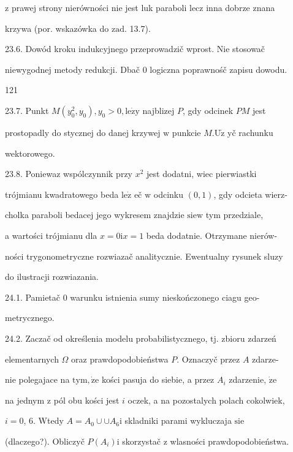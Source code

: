 \documentclass[a4paper,12pt]{article}
\begin{document}
$\mathrm{z}$ prawej strony nierówności nie jest luk paraboli lecz inna dobrze znana

krzywa (por. wskazówka do $\mathrm{z}\mathrm{a}\mathrm{d}$. 13.7).

23.6. Dowód kroku indukcyjnego przeprowadzič wprost. Nie stosowač

niewygodnej metody redukcji. Dbač $0$ logiczna poprawnośč zapisu dowodu.





121

23.7. Punkt $M(y_{0}^{2},y_{0}), y_{0}>0, \mathrm{l}\mathrm{e}\dot{\mathrm{z}}\mathrm{y}$ najblizej $P$, gdy odcinek $PM$ jest

prostopadly do stycznej do danej krzywej $\mathrm{w}$ punkcie $M. \mathrm{U}\dot{\mathrm{z}}$ yč rachunku

wektorowego.

23.8. Poniewaz wspólczynnik przy $x^{2}$ jest dodatni, wiec pierwiastki

trójmianu kwadratowego beda $\mathrm{l}\mathrm{e}\dot{\mathrm{z}}$ eč $\mathrm{w}$ odcinku $(0,1)$, gdy odcieta wierz-

cholka paraboli bedacej jego wykresem znajdzie $\mathrm{s}\mathrm{i}\mathrm{e} \mathrm{w}$ tym przedziale,

a wartości trójmianu dla $x=0\mathrm{i}x=1$ beda dodatnie. Otrzymane nierów-

ności trygonometryczne rozwiazač analitycznie. Ewentualny rysunek sluzy

do ilustracji rozwiazania.

24.1. Pamietač 0 warunku istnienia sumy nieskończonego ciagu geo-

metrycznego.

24.2. Zaczač od określenia modelu probabilistycznego, $\mathrm{t}\mathrm{j}$. zbioru zdarzeń

elementarnych $\Omega$ oraz prawdopodobieństwa $P$. Oznaczyč przez $A$ zdarze-

nie polegajace na $\mathrm{t}\mathrm{y}\mathrm{m}, \dot{\mathrm{z}}\mathrm{e}$ kości pasuja do siebie, a przez $A_{i}$ zdarzenie, $\dot{\mathrm{z}}\mathrm{e}$

na jednym $\mathrm{z}$ pól obu kości jest $i$ oczek, a na pozostalych polach cokolwiek,

$i=0$, 6. Wtedy $ A=A_{0}\cup \cup A_{6} \mathrm{i}$ skladniki parami wykluczaja $\mathrm{s}\mathrm{i}\mathrm{e}$

(dlaczego?). Obliczyč $P(A_{i})\mathrm{i}$ skorzystač $\mathrm{z}$ wlasności prawdopodobieństwa.
\end{document}
